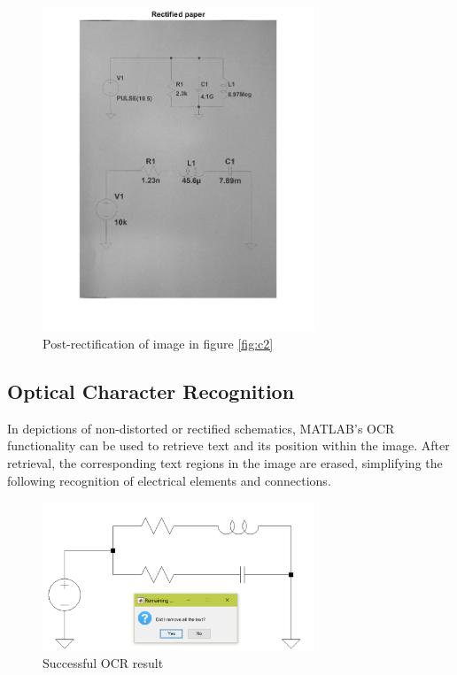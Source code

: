 \documentclass[10pt,twocolumn,letterpaper]{article}
\begin{document}
\begin{figure}[!ht]
\includegraphics[width = 3.2in]{img/rect.png}
\caption{Post-rectification of image in figure \ref{fig:c2}}
\label{fig:c5}
\end{figure}

\subsection{Optical Character Recognition}
\label{subsec:ocr}

In depictions of non-distorted or rectified schematics, MATLAB's OCR functionality can be used to retrieve text and its position within the image. After retrieval, the corresponding text regions in the image are erased, simplifying the following recognition of electrical elements and connections.
\par

\begin{figure}[!ht]
\includegraphics[width = 3.2in]{img/ocr.png}
\caption{Successful OCR result}
\label{fig:ocr}
\end{figure}
\par
\end{document}
